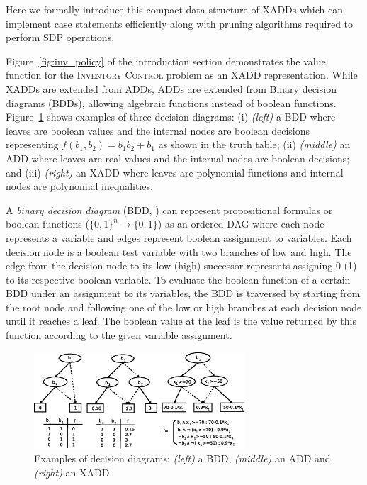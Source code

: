 \documentclass[twoside,11pt]{article}
\newcommand{\InventoryControl}{\textsc{Inventory Control }}
\begin{document}
Here we formally introduce this compact data structure of XADDs which can implement case statements efficiently along with pruning algorithms required to perform SDP operations.
 
 Figure~\ref{fig:inv_policy} of the introduction section demonstrates the value function for the \InventoryControl problem as an XADD representation. While XADDs are extended from ADDs, ADDs are extended from Binary decision diagrams (BDDs), allowing algebraic functions instead of boolean functions. 
 Figure~\ref{fig:bdd_add_xadd} shows examples of three decision diagrams: (i) {\it (left)} a BDD where leaves are boolean values and the internal nodes are boolean decisions representing $f(b_1,b_2) = b_1\bar{b_2}+\bar{b_1}$ as shown in the truth table; (ii) {\it (middle)} an ADD where leaves are real values  and the internal nodes are boolean decisions; and (iii) {\it (right)} an XADD where leaves are polynomial functions and internal nodes are polynomial inequalities.   

A \emph{binary decision diagram} (BDD, \cite{bryant}) can represent propositional formulas or boolean functions ($\lbrace 0,1\rbrace^n \rightarrow \lbrace 0,1\rbrace$) as an ordered DAG where each node represents a variable and edges represent boolean assignment to  variables. Each decision node is a boolean test variable with two branches of low and high. The edge from the decision node to its low (high) successor represents assigning 0 (1) to its respective boolean variable. To evaluate the boolean function of a certain BDD under an assignment to its variables, the BDD is traversed by starting from the root node and following one of the low or high branches at each decision node until it reaches a leaf. The boolean value at the leaf is the value returned by this function according to the given variable assignment. 
\begin{figure}[t!]
\centering
\includegraphics[width=0.7\textwidth]{FiguresSource/bddaddxadd.eps}
\vspace{-1mm}

\caption{%
Examples of decision diagrams: {\it (left)} a BDD, {\it (middle)} an ADD and {\it (right)} an XADD.}
\label{fig:bdd_add_xadd}
\end{figure}
\end{document}
